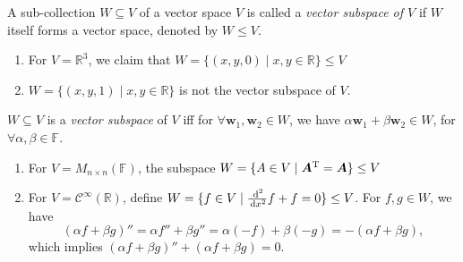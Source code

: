 \begin{definition}
A sub-collection $W\subseteq V$ of a vector space $V$ is called a \emph{vector subspace of $V$} if $W$ itself forms a vector space, denoted by $W\le V$.
\end{definition}
\begin{example}
\begin{enumerate}
\item
For $V=\mathbb{R}^3$, we claim that $W=\{(x,y,0)\mid x,y\in\mathbb{R}\}\le V$
\item
$W=\{(x,y,1)\mid x,y\in\mathbb{R}\}$ is not the vector subspace of $V$.
\end{enumerate}
\end{example}
\begin{proposition}
$W\subseteq V$ is a \emph{vector subspace} of $V$ iff for $\forall\bm w_1,\bm w_2\in W$, we have $\alpha\bm w_1+\beta\bm w_2\in W$, for $\forall\alpha,\beta\in\mathbb{F}$.
\end{proposition}
\begin{example}
\begin{enumerate}
\item
For $V=M_{n\times n}(\mathbb{F})$, the subspace $W=\{A\in V\mid \bm A^{\mathrm T}=\bm A\}\le V$
\item
For $V=\mathcal{C}^\infty(\mathbb{R})$, define $W=\{f\in V\mid\frac{\,\mathrm{d}^2}{\,\mathrm{d} x^2}f+f=0\}\le V$. For $f,g\in W$, we have
\[
(\alpha f+\beta g)''=\alpha f''+\beta g''=\alpha(-f)+\beta(-g)=-(\alpha f+\beta g),
\]
which implies $(\alpha f+\beta g)''+(\alpha f+\beta g)=0$.
\end{enumerate}
\end{example}





%













